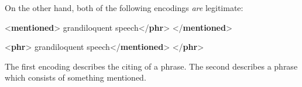 On the other hand, both of the following encodings \textit{are} legitimate: \par\bgroup{}\exampleFont \begin{shaded}\noindent\mbox{}{<\textbf{mentioned}>}\mbox{}\newline 
{}grandiloquent speech{</\textbf{phr}>}\mbox{}\newline 
{</\textbf{mentioned}>}\end{shaded}\egroup\par \noindent  \par\bgroup{}\exampleFont \begin{shaded}\noindent\mbox{}{<\textbf{phr}>}\mbox{}\newline 
{}grandiloquent speech{</\textbf{mentioned}>}\mbox{}\newline 
{</\textbf{phr}>}\end{shaded}\egroup\par \noindent  The first encoding describes the citing of a phrase. The second describes a phrase which consists of something mentioned. \par
